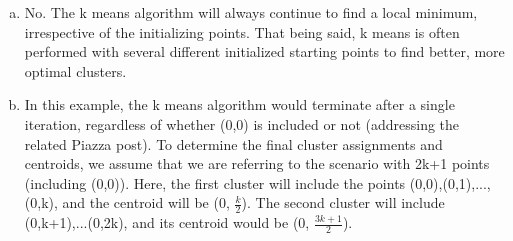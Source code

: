 \begin{enumerate}[(a)]
    \item 
    No. The k means algorithm will always continue to find a local minimum, irrespective of the initializing points. That being said, k means is often performed with several different initialized starting points to find better, more optimal clusters.
    
    \item 
    In this example, the k means algorithm would terminate after a single iteration, regardless of whether (0,0) is included or not (addressing the related Piazza post). To determine the final cluster assignments and centroids, we assume that we are referring to the scenario with 2k+1 points (including (0,0)). Here, the first cluster will include the points (0,0),(0,1),...,(0,k), and the centroid will be (0, $\frac{k}{2}$). The second cluster will include (0,k+1),...(0,2k), and its centroid would be (0, $\frac{3k+1}{2}$).
\end{enumerate}